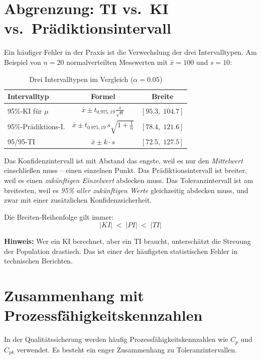 \documentclass[10pt,a4paper,twocolumn]{article}
\theoremstyle{definition}
\newcommand{\hinweis}[1]{%
    \begin{center}
    \colorbox{noteblue}{\parbox{0.92\linewidth}{\small\textbf{Hinweis:} #1}}
    \end{center}
}
\newcommand{\TI}{Toleranzintervall}
\newcommand{\KI}{Konfidenzintervall}
\newcommand{\xbar}{\bar{x}}
\begin{document}
\section{Abgrenzung: TI vs.\ KI vs.\ Prädiktionsintervall}
\label{sec:abgrenzung}

Ein häufiger Fehler in der Praxis ist die Verwechslung der drei
Intervalltypen. Am Beispiel von $n = 20$ normalverteilten
Messwerten mit $\xbar = 100$ und $s = 10$:

\begin{table}[H]
\centering
\caption{Drei Intervalltypen im Vergleich ($\alpha = 0.05$)}
\label{tab:vergleich}
\small
\begin{tabular}{@{}lcc@{}}
\toprule
\textbf{Intervalltyp} & \textbf{Formel} & \textbf{Breite} \\
\midrule
95\%-KI für $\mu$ &
    $\xbar \pm t_{0.975,19}\frac{s}{\sqrt{n}}$ &
    $[95.3,\; 104.7]$ \\[3pt]
95\%-Prädiktions-I. &
    $\xbar \pm t_{0.975,19}\,s\sqrt{1+\frac{1}{n}}$ &
    $[78.4,\; 121.6]$ \\[3pt]
95/95-TI &
    $\xbar \pm k \cdot s$ &
    $[72.5,\; 127.5]$ \\
\bottomrule
\end{tabular}
\end{table}

Das \KI{} ist mit Abstand das engste, weil es nur den
\emph{Mittelwert} einschließen muss -- einen einzelnen Punkt.
Das Prädiktionsintervall ist breiter, weil es einen
\emph{zukünftigen Einzelwert} abdecken muss. Das \TI{} ist
am breitesten, weil es \emph{95\% aller zukünftigen Werte}
gleichzeitig abdecken muss, und zwar mit einer zusätzlichen
Konfidenzsicherheit.

Die Breiten-Reihenfolge gilt immer:
\[
    |KI| \;<\; |PI| \;<\; |TI|
\]

\hinweis{Wer ein KI berechnet, aber ein TI braucht, unterschätzt
die Streuung der Population drastisch. Das ist einer der
häufigsten statistischen Fehler in technischen Berichten.}


\section{Zusammenhang mit Prozessfähigkeitskennzahlen}
\label{sec:cpk}

In der Qualitätssicherung werden häufig Prozessfähigkeitskennzahlen
wie $C_p$ und $C_{pk}$ verwendet. Es besteht ein enger Zusammenhang
zu Toleranzintervallen.
\end{document}
